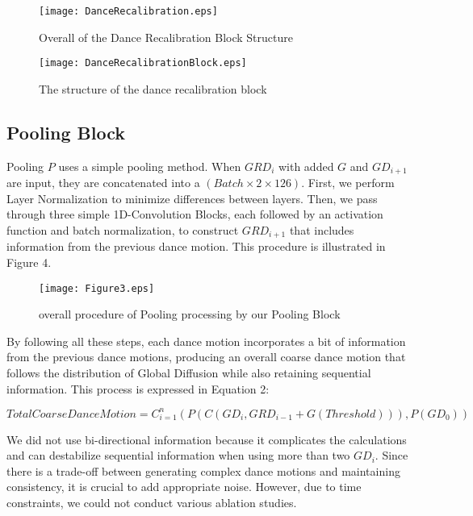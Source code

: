 \begin{figure}[!t]
    \centering
    \texttt{[image: DanceRecalibration.eps]}
    \caption{Overall of the Dance Recalibration Block Structure}
    \label{fig:enter-label1}
\end{figure}

\begin{figure}[!t]
    \centering
    \texttt{[image: DanceRecalibrationBlock.eps]}
    \caption{The structure of the dance recalibration block}
    \label{fig:enter-label2}
\end{figure}

\subsection{Pooling Block}
Pooling \(P\) uses a simple pooling method. When \(GRD_{i}\) with added \(G\) and \(GD_{i+1}\) are input, they are concatenated into a \((Batch\times2\times126)\). First, we perform Layer Normalization to minimize differences between layers. Then, we pass through three simple 1D-Convolution Blocks, each followed by an activation function and batch normalization, to construct \(GRD_{i+1}\) that includes information from the previous dance motion. This procedure is illustrated in Figure 4.

\begin{figure}[!t]
    \centering
    \texttt{[image: Figure3.eps]}
    \caption{overall procedure of Pooling processing by our Pooling Block}
    \label{fig:enter-label3}
\end{figure}

By following all these steps, each dance motion incorporates a bit of information from the previous dance motions, producing an overall coarse dance motion that follows the distribution of Global Diffusion while also retaining sequential information. This process is expressed in Equation 2:

\begin{equation}
    Total Coarse Dance Motion = C_{i=1}^{n}(P(C(GD_{i} , GRD_{i-1} + G(Threshold))), P(GD_{0}))
\end{equation}

We did not use bi-directional information because it complicates the calculations and can destabilize sequential information when using more than two \(GD_{i}\). Since there is a trade-off between generating complex dance motions and maintaining consistency, it is crucial to add appropriate noise. However, due to time constraints, we could not conduct various ablation studies.